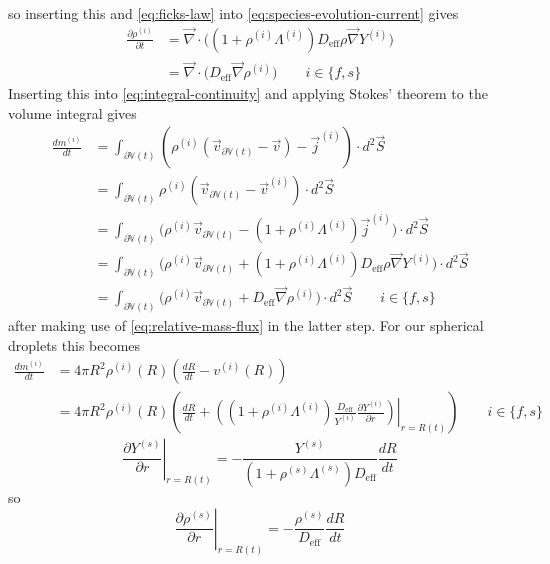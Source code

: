 \documentclass[12pt]{report}
\begin{document}
so inserting this and \eqref{eq:ficks-law} into \eqref{eq:species-evolution-current} gives
\begin{equation}\label{eq:species-evolution-final}
  \begin{aligned}
    \frac{\partial \rho^{(i)}}{\partial t} &=
    \vec{\nabla} \cdot \Big(
    (1 + \rho^{(i)} \Lambda^{(i)})
    D_{\textrm{eff}} \rho \vec{\nabla} Y^{(i)}
    \Big) \\
    &=
    \vec{\nabla} \cdot \Big(
    D_{\textrm{eff}} \vec{\nabla} \rho^{(i)}
    \Big)
    \qquad i \in \{f,s\}
  \end{aligned}
\end{equation}
Inserting this into \eqref{eq:integral-continuity} and applying Stokes' theorem to the volume integral gives
\begin{equation}
  \begin{aligned}
    \frac{d m^{(i)}}{dt} &=
    \int_{\partial \mathbb{V}(t)}
    (\rho^{(i)} (\vec{v}_{\partial \mathbb{V}(t)} - \vec{v}) - \vec{j}^{(i)})
    \cdot d^2\vec{S} \\
    &=
    \int_{\partial \mathbb{V}(t)}
    \rho^{(i)} (\vec{v}_{\partial \mathbb{V}(t)} - \vec{v}^{(i)})
    \cdot d^2\vec{S} \\
    &=
    \int_{\partial \mathbb{V}(t)}
    \Big(
    \rho^{(i)} \vec{v}_{\partial \mathbb{V}(t)} -
    (1 + \rho^{(i)} \Lambda^{(i)}) \vec{j}^{(i)}
    \Big)
    \cdot d^2\vec{S} \\
    &=
    \int_{\partial \mathbb{V}(t)}
    \Big(
    \rho^{(i)} \vec{v}_{\partial \mathbb{V}(t)} +
    (1 + \rho^{(i)} \Lambda^{(i)})
    D_{\textrm{eff}} \rho \vec{\nabla} Y^{(i)}
    \Big)
    \cdot d^2\vec{S} \\
    &=
    \int_{\partial \mathbb{V}(t)}
    \Big(
    \rho^{(i)} \vec{v}_{\partial \mathbb{V}(t)} +
    D_{\textrm{eff}} \vec{\nabla} \rho^{(i)}
    \Big)
    \cdot d^2\vec{S}
    \qquad i \in \{f,s\}
  \end{aligned}
\end{equation}
after making use of \eqref{eq:relative-mass-flux} in the latter step.
For our spherical droplets this becomes
\begin{equation}
  \begin{aligned}
    \frac{d m^{(i)}}{dt} &=
    4 \pi R^2
    \rho^{(i)}(R) \left( \frac{dR}{dt} - v^{(i)}(R) \right) \\
    &=
    4 \pi R^2
    \rho^{(i)}(R) \left(
    \frac{dR}{dt} +
    \left.\left(
    (1 + \rho^{(i)} \Lambda^{(i)})
    \frac{D_{\textrm{eff}}}{Y^{(i)}}
    \frac{\partial Y^{(i)}}{\partial r}
    \right)\right|_{r=R(t)}
    \right)
    \qquad i \in \{f,s\}
  \end{aligned}
\end{equation}
\begin{equation}
  \left. \frac{\partial Y^{(s)}}{\partial r} \right|_{r=R(t)} =
  -
  \frac{Y^{(s)}}{(1 + \rho^{(s)} \Lambda^{(s)}) D_{\textrm{eff}}}
  \frac{dR}{dt}
\end{equation}
so
\begin{equation}
  \left. \frac{\partial \rho^{(s)}}{\partial r} \right|_{r=R(t)} =
  -
  \frac{\rho^{(s)}}{D_{\textrm{eff}}}
  \frac{dR}{dt}
\end{equation}
\end{document}
